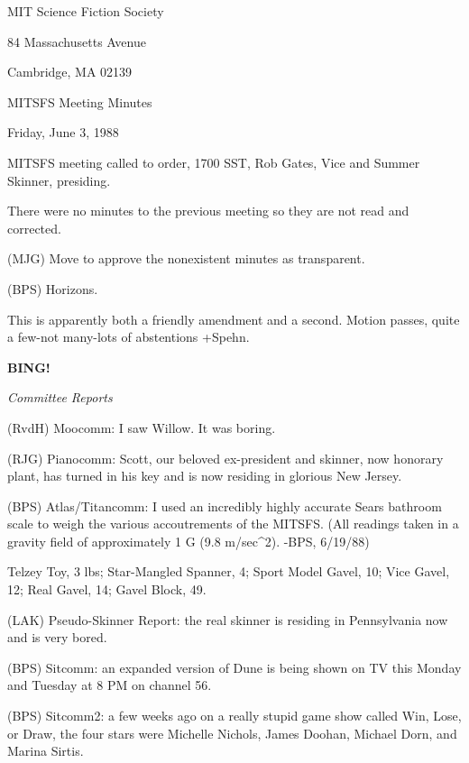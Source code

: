 \documentclass[12pt]{article}
\newcommand{\bing}{{\bf BING!} }
\newcommand{\goto}[1]{\bing \vskip 12pt \centerline{{\em{#1}}}}
\begin{document}
\begin{center}

MIT Science Fiction Society 

84 Massachusetts Avenue

Cambridge, MA 02139

\vspace{12pt}

MITSFS Meeting Minutes 

Friday, June 3, 1988

\end{center}
 
\vspace{18pt}

\setlength{\parskip}{6pt}

\noindent
MITSFS meeting called to order, 1700 SST,
Rob Gates, Vice and Summer Skinner, presiding.

There were no minutes to the previous meeting so they are not read and corrected.

(MJG) Move to approve the nonexistent minutes as transparent.

(BPS) Horizons.

This is apparently both a friendly amendment and a second. Motion passes, quite a few-not many-lots of abstentions +Spehn.

\goto{Committee Reports}

(RvdH) Moocomm: I saw Willow. It was boring.

(RJG) Pianocomm: Scott, our beloved ex-president and skinner, now honorary plant, has turned in his key and is now residing in glorious New Jersey.

(BPS) Atlas/Titancomm: I used an incredibly highly accurate Sears bathroom scale to weigh the various accoutrements of the MITSFS. (All readings taken in a gravity field of approximately 1 G (9.8 m/sec^2). -BPS, 6/19/88)

Telzey Toy, 3 lbs; Star-Mangled Spanner, 4; Sport Model Gavel, 10; Vice Gavel, 12; Real Gavel, 14; Gavel Block, 49.

(LAK) Pseudo-Skinner Report: the real skinner is residing in Pennsylvania now and is very bored.

(BPS) Sitcomm: an expanded version of Dune is being shown on TV this Monday and Tuesday at 8 PM on channel 56.

(BPS) Sitcomm2: a few weeks ago on a really stupid game show called Win, Lose, or Draw, the four stars were Michelle Nichols, James Doohan, Michael Dorn, and Marina Sirtis.
\end{document}
